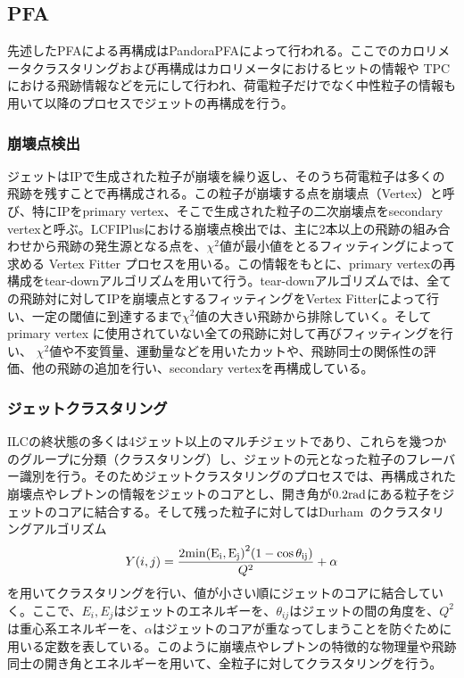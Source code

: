 \subsection{PFA}
先述したPFAによる再構成はPandoraPFAによって行われる。ここでのカロリメータクラスタリングおよび再構成はカロリメータにおけるヒットの情報や TPC における飛跡情報などを元にして行われ、荷電粒子だけでなく中性粒子の情報も用いて以降のプロセスでジェットの再構成を行う。

\subsubsection{崩壊点検出}
ジェットはIPで生成された粒子が崩壊を繰り返し、そのうち荷電粒子は多くの飛跡を残すことで再構成される。この粒子が崩壊する点を崩壊点（Vertex）と呼び、特にIPをprimary vertex、そこで生成された粒子の二次崩壊点をsecondary vertexと呼ぶ。LCFIPlusにおける崩壊点検出では、主に2本以上の飛跡の組み合わせから飛跡の発生源となる点を、${\chi}^2$値が最小値をとるフィッティングによって求める Vertex Fitter プロセスを用いる。この情報をもとに、primary vertexの再構成をtear-downアルゴリズムを用いて行う。tear-downアルゴリズムでは、全ての飛跡対に対してIPを崩壊点とするフィッティングをVertex Fitterによって行い、一定の閾値に到達するまで${\chi}^2$値の大きい飛跡から排除していく。そしてprimary vertex に使用されていない全ての飛跡に対して再びフィッティングを行い、 ${\chi}^2$値や不変質量、運動量などを用いたカットや、飛跡同士の関係性の評価、他の飛跡の追加を行い、secondary vertexを再構成している。

\subsubsection{ジェットクラスタリング}
ILCの終状態の多くは4ジェット以上のマルチジェットであり、これらを幾つかのグループに分類（クラスタリング）し、ジェットの元となった粒子のフレーバー識別を行う。そのためジェットクラスタリングのプロセスでは、再構成された崩壊点やレプトンの情報をジェットのコアとし、開き角が$0.2 \rm{rad}$にある粒子をジェットのコアに結合する。そして残った粒子に対してはDurham~\cite{durham}のクラスタリングアルゴリズム
\begin{align}
Y(i, j) = \frac{2 \rm{min} {( E_i, E_j )}^2 (1- \cos {\theta}_{ij})}{Q^2} + \alpha
\end{align}
を用いてクラスタリングを行い、値が小さい順にジェットのコアに結合していく。ここで、$E_i, E_j$はジェットのエネルギーを、$\theta_{ij}$はジェットの間の角度を、$Q^2$は重心系エネルギーを、$\alpha$はジェットのコアが重なってしまうことを防ぐために用いる定数を表している。このように崩壊点やレプトンの特徴的な物理量や飛跡同士の開き角とエネルギーを用いて、全粒子に対してクラスタリングを行う。

